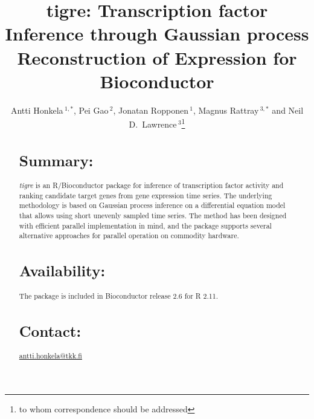 \documentclass{bioinfo}
\newcommand{\tigre}{\emph{tigre}}
\begin{document}

\title[tigre]{tigre: Transcription factor Inference through Gaussian process Reconstruction of Expression for Bioconductor}
\author[Honkela \textit{et~al.}]{Antti Honkela\,$^{1,*}$, Pei Gao\,$^{2}$, Jonatan Ropponen\,$^{1}$, Magnus Rattray\,$^{3,*}$ and Neil D.\ Lawrence\,$^3$\footnote{to whom correspondence should be addressed}}
\address{$^{1}$Department of Information and Computer Science, Aalto
  University School of Science and Technology, Helsinki, Finland\\
  $^{2}$Department of of Public Health and Primary Care, University of
  Cambridge, Cambridge, UK\\
  $^{3}$Department of Computer Science, University of Sheffield,
  Sheffield, UK}



\maketitle

\begin{abstract}

\section{Summary:}
\tigre{} is an R/Bioconductor package for inference of transcription
factor activity and ranking candidate target genes from gene
expression time series.  The underlying methodology is based on
Gaussian process inference on a differential equation model that
allows using short unevenly sampled time series.  The method has been
designed with efficient parallel implementation in mind, and the
package supports several alternative approaches for parallel operation
on commodity hardware.

\section{Availability:}
The package is included in Bioconductor release 2.6 for R 2.11.

\section{Contact:} \href{antti.honkela@tkk.fi}{antti.honkela@tkk.fi}
\end{abstract}
\end{document}
